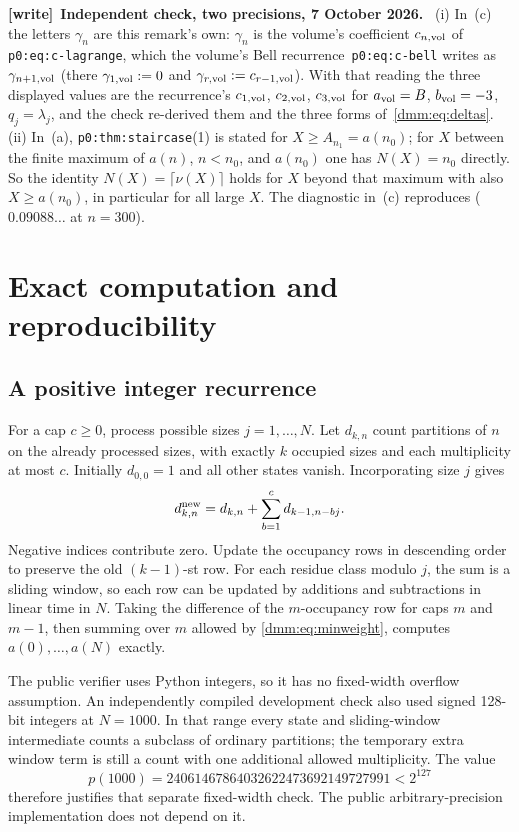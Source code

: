 \documentclass[11pt,letterpaper]{article}
\numberwithin{equation}{section}
\theoremstyle{definition}\newtheorem{definition}[theorem]{Definition}
\theoremstyle{remark}\newtheorem{remark}[theorem]{Remark}
\newcommand{\file}[1]{\nolinkurl{#1}}
\newenvironment{writenote}[1][]{\par\smallskip\begingroup\small
 \noindent\textbf{[write]}\if\relax\detokenize{#1}\relax\else~\textbf{#1.}\fi\ }%
 {\par\endgroup\smallskip}
\begin{document}
\begin{writenote}[Independent check, two precisions, 7 October 2026]
(i) In~(c) the letters $\gamma_n$ are this remark's own: $\gamma_n$ is the
volume's coefficient $c_{n,\rm vol}$ of \file{p0:eq:c-lagrange}, which the
volume's Bell recurrence~\file{p0:eq:c-bell} writes as
$\gamma_{n+1,\rm vol}$ (there $\gamma_{1,\rm vol}:=0$ and
$\gamma_{r,\rm vol}:=c_{r-1,\rm vol}$). With that reading the three
displayed values are the recurrence's $c_{1,\rm vol}$, $c_{2,\rm vol}$,
$c_{3,\rm vol}$ for $a_{\rm vol}=B$, $b_{\rm vol}=-3$, $q_j=\lambda_j$, and
the check re-derived them and the three forms of~\eqref{dmm:eq:deltas}.
(ii) In~(a), \file{p0:thm:staircase}(1) is stated for $X\ge A_{n_1}=a(n_0)$;
for $X$ between the finite maximum of $a(n)$, $n<n_0$, and $a(n_0)$ one has
$N(X)=n_0$ directly. So the identity $N(X)=\lceil\nu(X)\rceil$ holds for
$X$ beyond that maximum with also $X\ge a(n_0)$, in particular for all large
$X$. The diagnostic in~(c) reproduces ($0.09088\ldots$ at $n=300$).
\end{writenote}

\section{Exact computation and reproducibility}\label{dmm:sec:verification}
\subsection{A positive integer recurrence}
For a cap $c\ge0$, process possible sizes $j=1,\ldots,N$. Let $d_{k,n}$ count partitions of $n$ on the already processed sizes, with exactly $k$ occupied sizes and each multiplicity at most $c$. Initially $d_{0,0}=1$ and all other states vanish. Incorporating size $j$ gives
\begin{equation}\label{dmm:eq:DP}
d^{\rm new}_{k,n}=d_{k,n}+\sum_{b=1}^{c}d_{k-1,n-bj}.
\end{equation}
Negative indices contribute zero. Update the occupancy rows in descending order to preserve the old $(k-1)$-st row. For each residue class modulo $j$, the sum is a sliding window, so each row can be updated by additions and subtractions in linear time in $N$. Taking the difference of the $m$-occupancy row for caps $m$ and $m-1$, then summing over $m$ allowed by \eqref{dmm:eq:minweight}, computes $a(0),\ldots,a(N)$ exactly.

The public verifier uses Python integers, so it has no fixed-width overflow assumption. An independently compiled development check also used signed 128-bit integers at $N=1000$. In that range every state and sliding-window intermediate counts a subclass of ordinary partitions; the temporary extra window term is still a count with one additional allowed multiplicity. The value
\[
p(1000)=24061467864032622473692149727991<2^{127}
\]
therefore justifies that separate fixed-width check. The public arbitrary-precision implementation does not depend on it.
\end{document}
